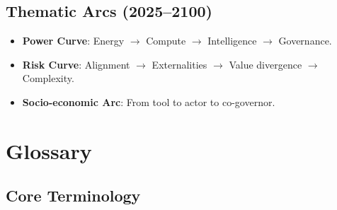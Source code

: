 \documentclass[11pt]{article}
\begin{document}
\subsection{Thematic Arcs (2025–2100)}
\begin{itemize}[noitemsep]
  \item \textbf{Power Curve}: Energy $\rightarrow$ Compute $\rightarrow$ Intelligence $\rightarrow$ Governance.
  \item \textbf{Risk Curve}: Alignment $\rightarrow$ Externalities $\rightarrow$ Value divergence $\rightarrow$ Complexity.
  \item \textbf{Socio-economic Arc}: From tool to actor to co-governor.
\end{itemize}

\clearpage

\section*{Glossary}

\subsection*{Core Terminology}
\end{document}
